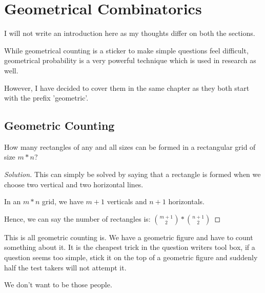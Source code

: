 \chapter{Geometrical Combinatorics}
I will not write an introduction here as my thoughts differ on both the sections.\par
While geometrical counting is a sticker to make simple questions feel difficult, geometrical probability 
is a very powerful technique which is used in research as well.\par
However, I have decided to cover them in the same chapter as they both start with the prefix 'geometric'.
\section{Geometric Counting}
\begin{example}
    How many rectangles of any and all sizes can be formed in a rectangular grid of size $m*n$?
\end{example}
\begin{proof}
    [Solution]
    This can simply be solved by saying that a rectangle is formed when we choose two vertical and 
    two horizontal lines.\par
    In an $m*n$ grid, we have $m+1$ verticals and $n+1$ horizontals. \par
    Hence, we can say the number of rectangles is: $\binom{m+1}{2}*\binom{n+1}{2}$
\end{proof}
This is all geometric counting is. We have a geometric 
figure and have to count something about it. It is the 
cheapest trick in the question writers tool box, if a question 
seems too simple, stick it on the top of a geometric figure and 
suddenly half the test takers will not attempt it.\par
We don't want to be those people.
